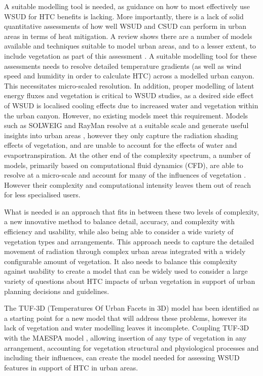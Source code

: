 \documentclass[final,3p,times,authoryear]{elsarticle}
\begin{document}
A suitable modelling tool is needed, as guidance on how to most effectively use WSUD for HTC benefits is lacking. More importantly, there is a lack of solid quantitative assessments of how well WSUD and CSUD can perform in urban areas in terms of heat mitigation. A review shows there are a number of models available and techniques suitable to model urban areas, and to a lesser extent, to include vegetation as part of this assessment \citep{Nice2016}. A suitable modelling tool for these assessments needs to resolve detailed temperature gradients (as well as wind speed and humidity in order to calculate HTC) across a modelled urban canyon. This necessitates micro-scaled resolution. In addition, proper modelling of latent energy fluxes and vegetation is critical to WSUD studies, as a desired side effect of WSUD is localised cooling effects due to increased water and vegetation within the urban canyon. However, no existing models meet this requirement. Models such as SOLWEIG \citep{SOLWEIG2011} and RayMan \citep{Matzarakis2007,Matzarakis2010} resolve at a suitable scale and generate useful insights into urban areas \citep{Chen2014a}, however they only capture the radiation shading effects of vegetation, and are unable to account for the effects of water and evaportranspiration. At the other end of the complexity spectrum, a number of models, primarily based on computational fluid dynamics (CFD), are able to resolve at a micro-scale and account for many of the influences of vegetation \citep{Bailey2014,Bailey2016,Kunz2000,Schlunzen2011a,Yamada2011,Bruse1999}. However their complexity and computational intensity leaves them out of reach for less specialised users.

What is needed is an approach that fits in between these two levels of complexity, a new innovative method to balance detail, accuracy, and complexity with efficiency and usability, while also being able to consider a wide variety of vegetation types and arrangements. This approach needs to capture the detailed movement of radiation through complex urban areas integrated with a widely configurable amount of vegetation. It also needs to balance this complexity against usability to create a model that can be widely used to consider a large variety of questions about HTC impacts of urban vegetation in support of urban planning decisions and guidelines. 

The TUF-3D (Temperatures Of Urban Facets in 3D) model \citep{Krayenhoff2007} has been identified as a starting point for a new model that will address these problems, however its lack of vegetation and water modelling leaves it incomplete. Coupling TUF-3D with the MAESPA model \citep{Duursma2012}, allowing insertion of any type of vegetation in any arrangement, accounting for vegetation structural and physiological processes and including their influences, can create the model needed for assessing WSUD features in support of HTC in urban areas.
\end{document}

